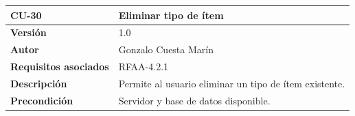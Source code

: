 \documentclass[
]{article}
\begin{document}
\begin{longtable}[]{@{}ll@{}}
\toprule
\begin{minipage}[b]{0.23\columnwidth}\raggedright
\textbf{CU-30}\strut
\end{minipage} & \begin{minipage}[b]{0.71\columnwidth}\raggedright
\textbf{Eliminar tipo de ítem}\strut
\end{minipage}\tabularnewline
\midrule
\endhead
\begin{minipage}[t]{0.23\columnwidth}\raggedright
\textbf{Versión}\strut
\end{minipage} & \begin{minipage}[t]{0.71\columnwidth}\raggedright
1.0\strut
\end{minipage}\tabularnewline
\begin{minipage}[t]{0.23\columnwidth}\raggedright
\textbf{Autor}\strut
\end{minipage} & \begin{minipage}[t]{0.71\columnwidth}\raggedright
Gonzalo Cuesta Marín\strut
\end{minipage}\tabularnewline
\begin{minipage}[t]{0.23\columnwidth}\raggedright
\textbf{Requisitos asociados}\strut
\end{minipage} & \begin{minipage}[t]{0.71\columnwidth}\raggedright
RFAA-4.2.1\strut
\end{minipage}\tabularnewline
\begin{minipage}[t]{0.23\columnwidth}\raggedright
\textbf{Descripción}\strut
\end{minipage} & \begin{minipage}[t]{0.71\columnwidth}\raggedright
Permite al usuario eliminar un tipo de ítem existente.\strut
\end{minipage}\tabularnewline
\begin{minipage}[t]{0.23\columnwidth}\raggedright
\textbf{Precondición}\strut
\end{minipage} & \begin{minipage}[t]{0.71\columnwidth}\raggedright
Servidor y base de datos disponible.


\end{minipage}
\end{longtable}
\end{document}
